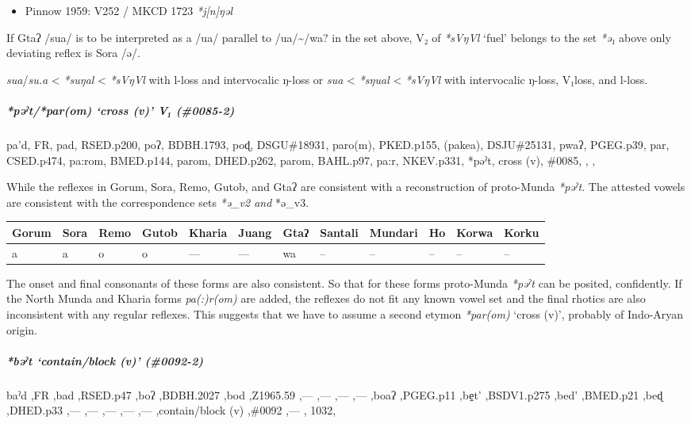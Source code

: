 \documentclass[a4paper,]{article}
\providecommand{\tightlist}{%
  \setlength{\itemsep}{0pt}\setlength{\parskip}{0pt}}
\let\oldsubparagraph\subparagraph
\renewcommand{\subparagraph}[1]{\oldsubparagraph{#1}\mbox{}}
\begin{document}
\begin{itemize}
\tightlist
\item
  Pinnow 1959: V252 / MKCD 1723 \emph{*j{[}n{]}ŋəl}
\end{itemize}

If Gtaʔ /sua/ is to be interpreted as a /ua/ parallel to
/ua/\textasciitilde{}/wa? in the set above, V₂ of \emph{*sVŋVl} `fuel'
belongs to the set \emph{*ə₁} above only deviating reflex is Sora /ə/.

\emph{sua}/\emph{su.a} \textless{} \emph{*suŋal} \textless{}
\emph{*sVŋVl} with l-loss and intervocalic ŋ-loss or \emph{sua}
\textless{} \emph{*sŋual} \textless{} \emph{*sVŋVl} with intervocalic
ŋ-loss, V₁loss, and l-loss.

\subparagraph{\texorpdfstring{\emph{*pəˀt}/\emph{*par(om)} `cross (v)'
V₁
(\#0085-2)}{*pəˀt/*par(om) cross (v) V₁ (\#0085-2)}}\label{pux259ux2c0tparom-cross-v-v-0085-2}

pa'd, FR, pad, RSED.p200, poʔ, BDBH.1793, poɖ, DSGU\#18931, paro(m),
PKED.p155, (pakea), DSJU\#25131, pwaʔ, PGEG.p39, par, CSED.p474, pa:rom,
BMED.p144, parom, DHED.p262, parom, BAHL.p97, pa:r, NKEV.p331, *pəˀt,
cross (v), \#0085, , ,

While the reflexes in Gorum, Sora, Remo, Gutob, and Gtaʔ are consistent
with a reconstruction of proto-Munda \emph{*pəˀt}. The attested vowels
are consistent with the correspondence sets \emph{*ə\_v2 and }*ə\_v3.

\begin{longtable}[]{@{}llllllllllll@{}}
\toprule
Gorum & Sora & Remo & Gutob & Kharia & Juang & Gtaʔ & Santali & Mundari
& Ho & Korwa & Korku\tabularnewline
\midrule
\endhead
a & a & o & o & --- & --- & wa & -- & -- & -- & -- & --\tabularnewline
\bottomrule
\end{longtable}

The onset and final consonants of these forms are also consistent. So
that for these forms proto-Munda \emph{*pəˀt} can be posited,
confidently. If the North Munda and Kharia forms \emph{pa(:)r(om)} are
added, the reflexes do not fit any known vowel set and the final rhotics
are also inconsistent with any regular reflexes. This suggests that we
have to assume a second etymon \emph{*par(om)} `cross (v)', probably of
Indo-Aryan origin.

\subparagraph{\texorpdfstring{\emph{*bəˀt} `contain/block (v)'
(\#0092-2)}{*bəˀt contain/block (v) (\#0092-2)}}\label{bux259ux2c0t-containblock-v-0092-2}

baˀd ,FR ,bad ,RSED.p47 ,boʔ ,BDBH.2027 ,bod ,Z1965.59 ,--- ,--- ,---
,--- ,boaʔ ,PGEG.p11 ,be̠t' ,BSDV1.p275 ,bed' ,BMED.p21 ,beɖ ,DHED.p33
,--- ,--- ,--- ,--- ,--- ,contain/block (v) ,\#0092 ,--- , 1032,
\end{document}
